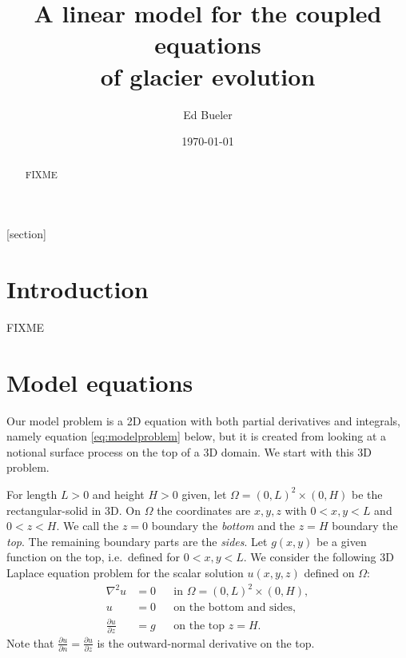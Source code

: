 \documentclass[letterpaper,final,12pt,reqno]{amsart}
\theoremstyle{cstyle}
\theoremstyle{cstyle*}
\theoremstyle{dstyle}
\numberwithin{equation}{section}
\numberwithin{figure}{section}
\numberwithin{table}{section}
\numberwithin{theorem}{section}
\newcommand{\grad}{\nabla}
\begin{document}
\title[A linear model for the coupled equations of glacier evolution]{A linear model for the coupled equations \\ of glacier evolution}

\author{Ed Bueler}

\date{\today}

\begin{abstract} FIXME
\end{abstract}

\maketitle


\thispagestyle{empty}

[section]


\section{Introduction} \label{sec:intro}

FIXME

\section{Model equations} \label{sec:model}

Our model problem is a 2D equation with both partial derivatives and integrals, namely equation \eqref{eq:modelproblem} below, but it is created from looking at a notional surface process on the top of a 3D domain.  We start with this 3D problem.

For length $L>0$ and height $H>0$ given, let $\Omega = (0,L)^2\times (0,H)$ be the rectangular-solid in 3D.  On $\Omega$ the coordinates are $x,y,z$ with $0<x,y<L$ and $0<z<H$.  We call the $z=0$ boundary the \emph{bottom} and the $z=H$ boundary the \emph{top}.  The remaining boundary parts are the \emph{sides}.  Let $g(x,y)$ be a given function on the top, i.e.~defined for $0<x,y<L$.  We consider the following 3D Laplace equation problem for the scalar solution $u(x,y,z)$ defined on $\Omega$:
\begin{subequations}
\label{laplaceproblem}
\begin{align}
\grad^2 u &= 0 & &\text{in } \Omega = (0,L)^2\times (0,H), \\
u &= 0 & &\text{on the bottom and sides}, \\
\frac{\partial u}{\partial z} &= g & &\text{on the top $z=H$}.
\end{align}
\end{subequations}
Note that $\frac{\partial u}{\partial n}=\frac{\partial u}{\partial z}$ is the outward-normal derivative on the top.
\end{document}
